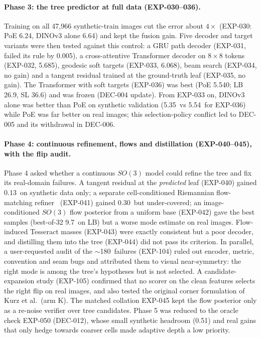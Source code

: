 \paragraph{Phase 3: the tree predictor at full data (EXP-030--036).}
Training on all 47,966 synthetic-train images cut the error about $4\times$ (EXP-030: PoE 6.24\appDdeg, DINOv3 alone 6.64\appDdeg) and kept the fusion gain. Five decoder and target variants were then tested against this control: a GRU path decoder (EXP-031, failed its rule by 0.005\appDdeg), a cross-attentive Transformer decoder on $8\times8$ tokens (EXP-032, 5.685\appDdeg), geodesic soft targets (EXP-033, 6.068\appDdeg), beam search (EXP-034, no gain) and a tangent residual trained at the ground-truth leaf (EXP-035, no gain). The Transformer with soft targets (EXP-036) was best (PoE 5.540\appDdeg; LB 26.9\appDdeg, SL 36.6\appDdeg) and was frozen (DEC-004 update). From EXP-033 on, DINOv3 alone was better than PoE on synthetic validation (5.35\appDdeg\ vs 5.54\appDdeg\ for EXP-036) while PoE was far better on real images; this selection-policy conflict led to DEC-005 and its withdrawal in DEC-006.

\paragraph{Phase 4: continuous refinement, flows and distillation (EXP-040--045), with the flip audit.}
Phase 4 asked whether a continuous $SO(3)$ model could refine the tree and fix its real-domain failures. A tangent residual at the \emph{predicted} leaf (EXP-040) gained 0.13\appDdeg\ on synthetic data only; a separate cell-conditioned Riemannian flow-matching refiner~\cite{chen2024rfm} (EXP-041) gained 0.30\appDdeg\ but under-covered; an image-conditioned $SO(3)$ flow posterior from a uniform base (EXP-042) gave the best samples (best-of-32 9.7\appDdeg\ on LB) but a worse mode estimate on real images. Flow-induced Tesseract masses (EXP-043) were exactly consistent but a poor decoder, and distilling them into the tree (EXP-044) did not pass its criterion. In parallel, a user-requested audit of the $\sim$180\appDdeg\ failures (EXP-104) ruled out encoder, metric, convention and seam bugs and attributed them to visual near-symmetry: the right mode is among the tree's hypotheses but is not selected. A candidate-expansion study (EXP-105) confirmed that no scorer on the clean features selects the right flip on real images, and also tested the original corner formulation of Kurz et al.\ (arm K). The matched collation EXP-045 kept the flow posterior only as a re-noise verifier over tree candidates. Phase 5 was reduced to the oracle check EXP-050 (DEC-012), whose small synthetic headroom (0.51\appDdeg) and real gains that only hedge towards coarser cells made adaptive depth a low priority.


